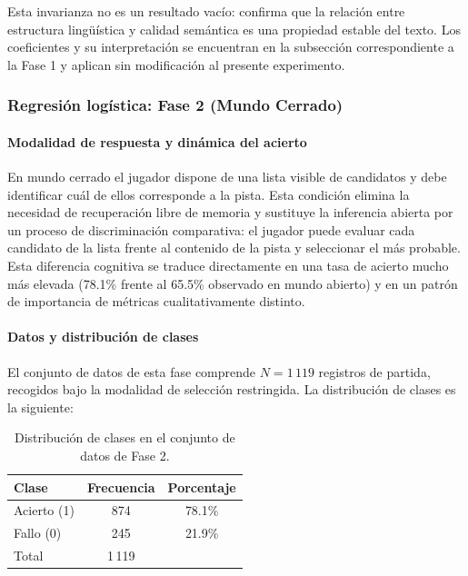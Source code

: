 \documentclass[../main.tex]{subfiles}
\begin{document}
Esta invarianza no es un resultado vacío: confirma que la relación entre estructura lingüística y calidad semántica es una propiedad estable del texto. Los coeficientes y su interpretación se encuentran en la subsección correspondiente a la Fase 1 y aplican sin modificación al presente experimento.

\subsubsection{Regresión logística: Fase 2 (Mundo Cerrado)}

\paragraph{Modalidad de respuesta y dinámica del acierto}

En mundo cerrado el jugador dispone de una lista visible de candidatos y debe identificar cuál de ellos corresponde a la pista. Esta condición elimina la necesidad de recuperación libre de memoria y sustituye la inferencia abierta por un proceso de discriminación comparativa: el jugador puede evaluar cada candidato de la lista frente al contenido de la pista y seleccionar el más probable. Esta diferencia cognitiva se traduce directamente en una tasa de acierto mucho más elevada (78.1\% frente al 65.5\% observado en mundo abierto) y en un patrón de importancia de métricas cualitativamente distinto.

\paragraph{Datos y distribución de clases}

El conjunto de datos de esta fase comprende \textbf{$N = 1\,119$} registros de partida, recogidos bajo la modalidad de selección restringida. La distribución de clases es la siguiente:

\begin{table}[H]
\centering
\begin{tabular}{lcc}
\hline
Clase & Frecuencia & Porcentaje \\
\hline
Acierto (1) & 874 & 78.1\% \\
Fallo (0)   & 245 & 21.9\% \\
\hline
Total & 1\,119 & \\
\hline
\end{tabular}
\caption{Distribución de clases en el conjunto de datos de Fase 2.}
\label{tab:clases_f2}
\end{table}
\end{document}
